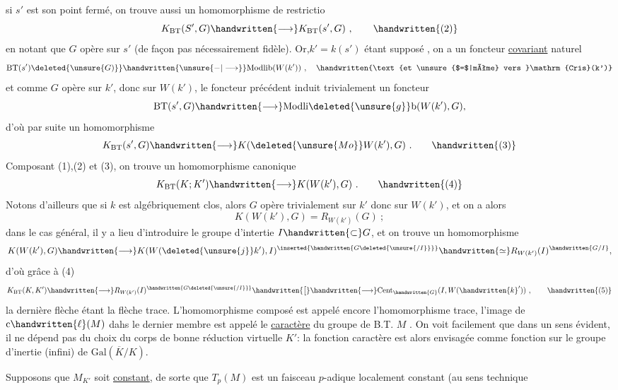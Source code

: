 si $s'$ est son point fermé, on trouve aussi un homomorphisme de restrictio
\[
K_{\mathrm{BT}}(S',G)\handwritten{\longrightarrow}K_{\mathrm{BT}}(s',G)\ ,\tag*{\handwritten{(2)}}
\]
en notant que $G$ opère sur $s'$ (de façon pas nécessairement fidèle). Or,$k'=k(s')$ étant supposé , on a un foncteur \uline{covariant} naturel
\[
\mathrm{BT}(s')\deleted{\unsure{G)}}\handwritten{\unsure{\mathord{-}|\longrightarrow}}\mathrm{Modlib}(W(k'))\ ,\quad
\handwritten{\text{et \unsure{$=$|même} vers }\mathrm{Cris}(k')}
\]
et comme $G$ opère sur $k'$, donc sur $W(k')$, le foncteur précédent induit trivialement un foncteur
\[
\mathrm{BT}(s',G)\handwritten{\longrightarrow}\mathrm{Modli}\deleted{\unsure{g}}\mathrm b(W(k'),G),
\]
d'où par suite un homomorphisme
\[
K_{\mathrm{BT}}(s',G)\handwritten{\longrightarrow}K(\deleted{\unsure{Mo}}W(k'),G)\ .\tag*{\handwritten{(3)}}
\]
Composant (1),(2) et (3), on trouve un homomorphisme canonique
\[
K_{\mathrm{BT}}(K;K')\handwritten{\longrightarrow}K(W(k'),G)\ .\tag*{\handwritten{(4)}}
\]
Notons d'ailleurs que si $k$ est algébriquement clos, alors $G$ opère trivialement sur $k'$ donc sur $W(k')$, et on a alors
\[
K(W(k'),G)=R_{W(k')}(G)\ ;
\]
dans le cas général, il y a lieu d'introduire le groupe d'intertie $I\handwritten{\subset}G$, et on trouve un homomorphisme
\[
K(W(k'),G)\handwritten{\longrightarrow}K(W(\deleted{\unsure{j}}k'),I)^{\inserted{\handwritten{G\deleted{\unsure{/I}}}}}\handwritten{\simeq}R_{W(k')}(I)^{\handwritten{G/I}},
\]
d'où grâce à (4)
\[
K_{\mathrm{BT}}(K,K')\handwritten{\longrightarrow}R_{W(k')}(I)^{\handwritten{G\deleted{\unsure{/I}}}}
\handwritten{\big[}\handwritten{\longrightarrow}\mathrm{Cent}_{\handwritten{G}}(I,W(\handwritten{k}'))\ ,\tag*{\handwritten{(5)}}
\]
la dernière flèche étant la flèche trace. L'homomorphisme composé est appelé encore l'homomorphisme trace, l'image de $\mathrm{c}\handwritten{\ell}(M)$ dahs le dernier membre est appelé le \uline{caractère} du groupe de B.T. $M$ . On voit facilement que dans un sens évident, il ne dépend pas du choix du corps de bonne réduction virtuelle $K'$: la fonction caractère est alors envisagée comme fonction sur le groupe d'inertie (infini) de $\mathrm{Gal}(\overline K/K)$.

Supposons que $M_{K'}$ soit \uline{constant}, de sorte que  $T_p(M)$ est un faisceau $p$-adique localement constant (au sens technique

